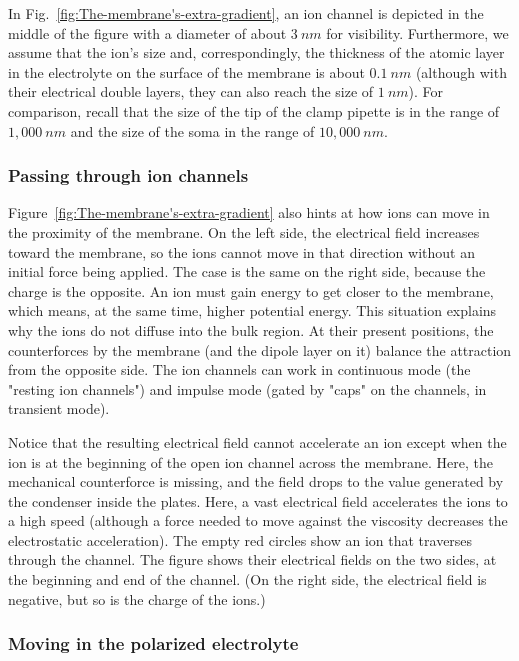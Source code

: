 In Fig.~\ref{fig:The-membrane's-extra-gradient},
an ion channel is
depicted in the middle of the figure with a diameter of about $3\ nm$ for visibility.
Furthermore, we assume that the ion's size and, correspondingly, the
thickness of the atomic layer in the electrolyte on the surface of
the membrane is about $0.1\ nm$ (although with their electrical double layers, they can also reach the size of $1\ nm$). For comparison, recall that the
size of the tip of the clamp pipette is in the range of $1,000\ nm$
and the size of the soma in the range of $10,000\ nm$. 


\subsubsection{Passing through ion channels\label{sec:Physics-PassingIonChannels}}
Figure~\ref{fig:The-membrane's-extra-gradient} also hints at how ions can move in the proximity of the membrane. On the left side, the electrical field increases toward the membrane, so the ions cannot move in that direction without an initial force being applied. The case is the same on the right side, because the charge is the opposite.
An ion must gain energy to get closer to the membrane, which means, at the same time, higher potential energy.
This situation explains why the ions do not diffuse into the bulk region.
At their present positions, the counterforces by the membrane (and the dipole layer on it)
balance the attraction from the opposite side.  The ion channels
can work in continuous mode (the "resting ion channels") and
impulse mode (gated by "caps" on the channels, in transient mode).

Notice that the resulting electrical field cannot accelerate an ion 
except when the ion is at the beginning of the open ion channel across the membrane. Here, the mechanical counterforce is missing, and the field drops to the value generated by the 
condenser inside the plates. Here, a vast electrical field accelerates the ions to a high speed (although a force needed to move against the viscosity decreases the electrostatic acceleration). The empty red circles show
an ion that traverses through the channel.
The figure shows their electrical fields on the two sides, at the beginning and end of the channel. (On the right side, the electrical field is negative, but so is the charge of the ions.)

\subsubsection{Moving in the polarized electrolyte\label{sec:Physics-MovingPolarized}}

